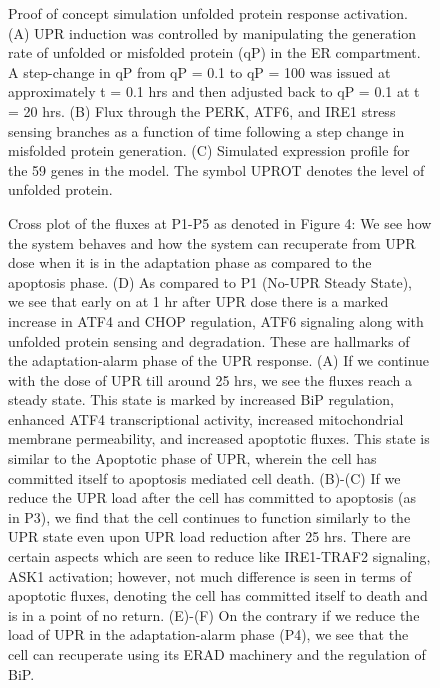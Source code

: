 \documentclass[fleqn,10pt]{wlscirep}
\begin{document}
\begin{figure}\centering
{}
	\caption{Proof of concept simulation unfolded protein response activation.
(A) UPR induction was controlled by manipulating the generation rate of unfolded or misfolded protein (qP) in the ER compartment. A step-change in qP from qP = 0.1 to qP = 100 was issued at approximately t = 0.1 hrs and then adjusted back to qP = 0.1 at t = 20 hrs.
(B) Flux through the PERK, ATF6, and IRE1 stress sensing branches as a function of time following a step change in misfolded protein generation.
(C) Simulated expression profile for the 59 genes in the model. The symbol UPROT denotes the level of unfolded protein.}
	\label{fg:proof_of_concept_simulation}
\end{figure}

\begin{figure}\centering
{}
	\caption{Cross plot of the fluxes at P1-P5 as denoted in Figure 4: We see how the system behaves and how the system can recuperate from UPR dose when it is in the adaptation phase as compared to the apoptosis phase. (D) As compared to P1 (No-UPR Steady State), we see that early on at 1 hr after UPR dose there is a marked increase in ATF4 and CHOP regulation, ATF6 signaling along with unfolded protein sensing and degradation. These are hallmarks of the adaptation-alarm phase of the UPR response. (A) If we continue with the dose of UPR till around 25 hrs, we see the fluxes reach a steady state. This state is marked by increased BiP regulation, enhanced ATF4 transcriptional activity, increased mitochondrial membrane permeability, and increased apoptotic fluxes. This state is similar to the Apoptotic phase of UPR, wherein the cell has committed itself to apoptosis mediated cell death. (B)-(C) If we reduce the UPR load after the cell has committed to apoptosis (as in P3), we find that the cell continues to function similarly to the UPR state even upon UPR load reduction after 25 hrs. There are certain aspects which are seen to reduce like IRE1-TRAF2 signaling, ASK1 activation; however, not much difference is seen in terms of apoptotic fluxes, denoting the cell has committed itself to death and is in a point of no return. (E)-(F) On the contrary if we reduce the load of UPR in the adaptation-alarm phase (P4), we see that the cell can recuperate using its ERAD machinery and the regulation of BiP.}
	\label{fg:cross_plot_flux}
\end{figure}
\end{document}

